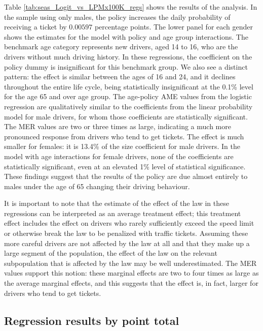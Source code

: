 \documentclass{cje}
\begin{document}
Table \ref{tab:seas_Logit_vs_LPMx100K_regs} shows the results of the analysis.
In the sample using only males, 
the policy increases the daily probability of receiving a ticket by $0.00597$ 
percentage points. 
The lower panel for each gender shows the estimates for the model with 
policy and age group interactions.  
The benchmark age category represents new drivers, 
aged 14 to 16, who are the drivers without much driving history.
In these regressions,   
the coefficient on the policy dummy is insignificant for this benchmark group. 
We also see a distinct pattern: 
the effect is similar between the ages of 16 and 24, 
and it declines throughout the entire life cycle, being statistically insignificant at the 0.1\% level for the age 65 and over age group.
% 
The age-policy AME values from the logistic regression 
are qualitatively similar to the coefficients from the linear probability model for male drivers, 
for whom those coefficients are statistically significant. 
The MER values are two or three times as large, 
indicating a much more pronounced response from drivers who tend to get tickets. 
% 
The effect is much smaller for females: it is 13.4\% of the size coefficient for male drivers. 
In the model with age interactions for female drivers, 
none of the coefficients are statistically significant,  
even at an elevated 1\% level of statistical significance. 
These findings suggest that the results of the policy are due almost entirely to males under the age of 65 changing their driving behaviour.
%


It is important to note that the estimate of the effect of the law in these regressions 
can be interpreted as an average treatment effect; 
this treatment effect includes the effect on drivers 
who rarely sufficiently exceed the speed limit 
or otherwise break the law to be penalized with traffic tickets. 
Assuming these more careful drivers are not affected by the law at all 
and that they make up a large segment of the population, 
the effect of the law on the relevant subpopulation that is affected by the law 
may be well underestimated.%
%
The MER values support this notion: 
these marginal effects are two to four times as large as the average marginal effects, 
and this suggests that the effect is, in fact, larger for drivers who tend to get tickets.

\subsection{Regression results by point total}
\label{sec:Empirical_by_pts}
\end{document}
